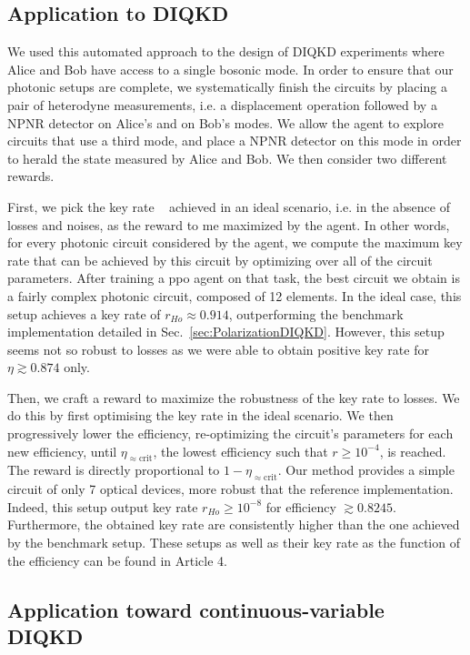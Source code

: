 \subsection{Application to DIQKD}
\label{sec:new_design}

We used this automated approach to the design of DIQKD experiments where Alice and Bob have access to a single bosonic mode. 
In order to ensure that our photonic setups are complete, we systematically finish the circuits by placing a pair of heterodyne measurements, i.e. a displacement operation followed by a NPNR detector on Alice's and on Bob's modes. 
We allow the agent to explore circuits that use a third mode, and place a NPNR detector on this mode in order to herald the state measured by Alice and Bob. 
We then consider two different rewards.

First, we pick the key rate ~ achieved in an ideal scenario, i.e. in the absence of losses and noises, as the reward to me maximized by the agent. 
In other words, for every photonic circuit considered by the agent, we compute the maximum key rate that can be achieved by this circuit by optimizing over all of the circuit parameters.
After training a \acrshort{ppo} agent on that task, the best circuit we obtain is a fairly complex photonic circuit, composed of 12 elements.
In the ideal case, this setup achieves a key rate of $r_{Ho}\approx 0.914$, outperforming the benchmark implementation detailed in Sec.~\ref{sec:PolarizationDIQKD}.
However, this setup seems not so robust to losses as we were able to obtain positive key rate for $\eta \apprge 0.874$ only.

Then, we craft a reward to maximize the robustness of the key rate to losses.
We do this by first optimising the key rate in the ideal scenario.
We then progressively lower the efficiency, re-optimizing the circuit's parameters for each new efficiency, until $\eta_{\approx\mathrm{crit}}$, the lowest efficiency such that $r \geq 10^{-4}$, is reached.
The reward is directly proportional to $1-\eta_{\approx \mathrm{crit}}$.
Our method provides a simple circuit of only 7 optical devices, more robust that the reference implementation.
Indeed, this setup output key rate $r_{Ho}\geq10^{-8}$ for efficiency $\apprge 0.8245$. 
Furthermore, the obtained key rate are consistently higher than the one achieved by the benchmark setup.
These setups as well as their key rate as the function of the efficiency can be found in Article 4.


\subsection{Application toward continuous-variable DIQKD}


